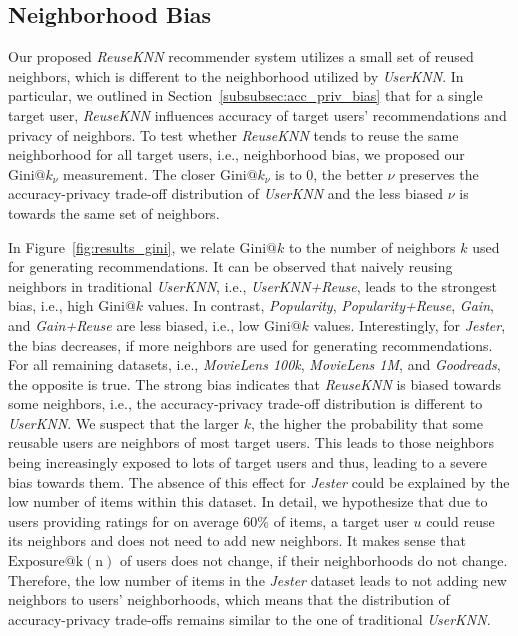 \documentclass[manuscript,review,anonymous]{acmart}
\begin{document}
\subsection{Neighborhood Bias}
Our proposed \emph{ReuseKNN} recommender system utilizes a small set of reused neighbors, which is different to the neighborhood utilized by \emph{UserKNN}.
In particular, we outlined in Section~\ref{subsubsec:acc_priv_bias} that for a single target user, \emph{ReuseKNN} influences accuracy of target users' recommendations and privacy of neighbors.
To test whether \emph{ReuseKNN} tends to reuse the same neighborhood for all target users, i.e., neighborhood bias, we proposed our $\mathrm{Gini}@k_\nu$ measurement.
The closer $\mathrm{Gini}@k_\nu$ is to 0, the better $\nu$ preserves the accuracy-privacy trade-off distribution of \emph{UserKNN} and the less biased $\nu$ is towards the same set of neighbors.

In Figure~\ref{fig:results_gini}, we relate $\mathrm{Gini}@k$ to the number of neighbors $k$ used for generating recommendations.
It can be observed that naively reusing neighbors in traditional \emph{UserKNN}, i.e., \emph{UserKNN+Reuse}, leads to the strongest bias, i.e., high $\mathrm{Gini}@k$ values.
In contrast, \emph{Popularity}, \emph{Popularity+Reuse}, \emph{Gain}, and \emph{Gain+Reuse} are less biased, i.e., low $\mathrm{Gini}@k$ values.
Interestingly, for \emph{Jester}, the bias decreases, if more neighbors are used for generating recommendations.
For all remaining datasets, i.e., \emph{MovieLens 100k}, \emph{MovieLens 1M}, and \emph{Goodreads}, the opposite is true.
The strong bias indicates that \emph{ReuseKNN} is biased towards some neighbors, i.e., the accuracy-privacy trade-off distribution is different to \emph{UserKNN}.
We suspect that the larger $k$, the higher the probability that some reusable users are neighbors of most target users.
This leads to those neighbors being increasingly exposed to lots of target users and thus, leading to a severe bias towards them. 
The absence of this effect for \emph{Jester} could be explained by the low number of items within this dataset. 
In detail, we hypothesize that due to users providing ratings for on average 60\% of items, a target user $u$ could reuse its neighbors and does not need to add new neighbors.
It makes sense that $\mathrm{Exposure@k(n)}$ of users does not change, if their neighborhoods do not change.
Therefore, the low number of items in the \emph{Jester} dataset leads to not adding new neighbors to users' neighborhoods, which means that the distribution of accuracy-privacy trade-offs remains similar to the one of traditional \emph{UserKNN}.
\end{document}
